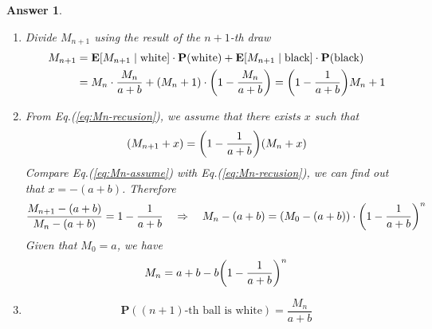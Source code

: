 \documentclass[utf8]{article}
\theoremstyle{definition}%
\theoremstyle{plain}%
\newtheorem{answer}{Answer} %
\begin{document}
\begin{answer} ~ 
    \begin{enumerate}[label=(\alph*)]
        \item Divide $M_{n+1}$ using the result of the $n+1$-th draw
        \begin{equation}
        \begin{aligned}
            \label{eq:Mn-recusion}
            M_{n+1} &= \mathbf{E}[M_{n+1} \mid \text{white}] \cdot \mathbf{P}(\text{white}) + \mathbf{E}[M_{n+1} \mid \text{black}] \cdot \mathbf{P}(\text{black}) \\ 
            &= M_n \cdot \frac{M_n}{a + b} + \qty(M_n + 1) \cdot \qty(1 - \frac{M_n}{a + b}) = \qty(1 - \frac{1}{a + b}) M_n + 1
        \end{aligned}
        \end{equation}
        \item From Eq.(\ref{eq:Mn-recusion}), we assume that there exists $x$ such that
        \begin{equation}
            \label{eq:Mn-assume}
            (M_{n+1} + x) = \qty(1 - \frac{1}{a + b}) (M_n + x)
        \end{equation}
        Compare Eq.(\ref{eq:Mn-assume}) with Eq.(\ref{eq:Mn-recusion}), we can find out that $x = -(a + b)$. Therefore 
        \begin{equation}
            \frac{M_{n+1} - (a + b)}{M_n - (a + b)} = 1 - \frac{1}{a + b} \quad \Rightarrow \quad M_n - (a + b) = (M_0 - (a + b)) \cdot \qty(1 - \frac{1}{a + b})^n
        \end{equation}
        Given that $M_0 = a$, we have
        \begin{equation}
            M_n = a + b - b \qty(1 - \frac{1}{a + b})^n
        \end{equation}
        \item \begin{equation}
            \mathbf{P}((n+1)\text{-th ball is white}) = \frac{M_n}{a + b}
        \end{equation}
    \end{enumerate}
\end{answer}
\end{document}
